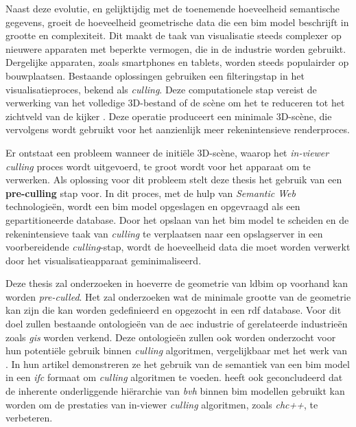 \begin{refsection}
\begin{multicols}{2}
        Naast deze evolutie, en gelijktijdig met de toenemende hoeveelheid semantische gegevens, groeit de hoeveelheid geometrische data die een \ac{bim} model beschrijft in grootte en complexiteit. Dit maakt de taak van visualisatie steeds complexer op nieuwere apparaten met beperkte vermogen, die in de industrie worden gebruikt. Dergelijke apparaten, zoals smartphones en tablets, worden steeds populairder op bouwplaatsen. Bestaande oplossingen gebruiken een filteringstap in het visualisatieproces, bekend als \emph{culling}. Deze computationele stap vereist de verwerking van het volledige 3D-bestand of de scène om het te reduceren tot het zichtveld van de kijker \parencite{Johansson2015}. Deze operatie produceert een minimale 3D-scène, die vervolgens wordt gebruikt voor het aanzienlijk meer rekenintensieve renderproces.

        Er ontstaat een probleem wanneer de initiële 3D-scène, waarop het \emph{in-viewer culling} proces wordt uitgevoerd, te groot wordt voor het apparaat om te verwerken. Als oplossing voor dit probleem stelt deze thesis het gebruik van een \textbf{pre-culling} stap voor. In dit proces, met de hulp van \emph{Semantic Web} technologieën, wordt een \ac{bim} model opgeslagen en opgevraagd als een gepartitioneerde database. Door het opslaan van het \ac{bim} model te scheiden en de rekenintensieve taak van \emph{culling} te verplaatsen naar een opslagserver in een voorbereidende \emph{culling}-stap, wordt de hoeveelheid data die moet worden verwerkt door het visualisatieapparaat geminimaliseerd.

        Deze thesis zal onderzoeken in hoeverre de geometrie van \ac{ldbim} op voorhand kan worden \emph{pre-culled}. Het zal onderzoeken wat de minimale grootte van de geometrie kan zijn die kan worden gedefinieerd en opgezocht in een \ac{rdf} database. Voor dit doel zullen bestaande ontologieën van de \ac{aec} industrie of gerelateerde industrieën zoals \emph{\ac{gis}} worden verkend. Deze ontologieën zullen ook worden onderzocht voor hun potentiële gebruik binnen \emph{culling} algoritmen, vergelijkbaar met het werk van \cite{Johansson2009}. In hun artikel demonstreren ze het gebruik van de semantiek van een \ac{bim} model in een \emph{\ac{ifc}} formaat om \emph{culling} algoritmen te voeden. \cite{Johansson2015} heeft ook geconcludeerd dat de inherente onderliggende hiërarchie van \emph{\ac{bvh}} binnen \ac{bim} modellen gebruikt kan worden om de prestaties van in-viewer \emph{culling} algoritmen, zoals \emph{\ac{chc}++}, te verbeteren.


\end{multicols}
\end{refsection}
